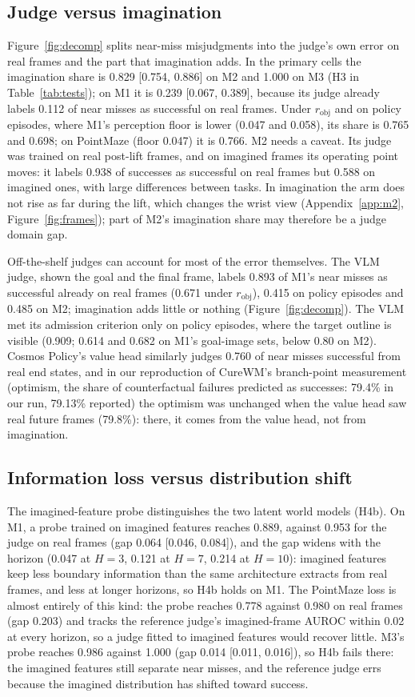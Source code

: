 \documentclass[10pt]{article}
\newcommand{\rob}{r_{\mathrm{obj}}}
\begin{document}
\subsection{Judge versus imagination}
\label{sec:judge}
Figure~\ref{fig:decomp} splits near-miss misjudgments into the judge's own error on real frames and the part that imagination adds. In the primary cells the imagination share is 0.829 [0.754, 0.886] on M2 and 1.000 on M3 (H3 in Table~\ref{tab:tests}); on M1 it is 0.239 [0.067, 0.389], because its judge already labels 0.112 of near misses as successful on real frames. Under $\rob$ and on policy episodes, where M1's perception floor is lower (0.047 and 0.058), its share is 0.765 and 0.698; on PointMaze (floor 0.047) it is 0.766. M2 needs a caveat. Its judge was trained on real post-lift frames, and on imagined frames its operating point moves: it labels 0.938 of successes as successful on real frames but 0.588 on imagined ones, with large differences between tasks. In imagination the arm does not rise as far during the lift, which changes the wrist view (Appendix~\ref{app:m2}, Figure~\ref{fig:frames}); part of M2's imagination share may therefore be a judge domain gap.

Off-the-shelf judges can account for most of the error themselves. The VLM judge, shown the goal and the final frame, labels 0.893 of M1's near misses as successful already on real frames (0.671 under $\rob$), 0.415 on policy episodes and 0.485 on M2; imagination adds little or nothing (Figure~\ref{fig:decomp}). The VLM met its admission criterion only on policy episodes, where the target outline is visible (0.909; 0.614 and 0.682 on M1's goal-image sets, below 0.80 on M2). Cosmos Policy's value head similarly judges 0.760 of near misses successful from real end states, and in our reproduction of CureWM's branch-point measurement (optimism, the share of counterfactual failures predicted as successes: 79.4\% in our run, 79.13\% reported) the optimism was unchanged when the value head saw real future frames (79.8\%): there, it comes from the value head, not from imagination.

\subsection{Information loss versus distribution shift}
\label{sec:infoloss}
The imagined-feature probe distinguishes the two latent world models (H4b). On M1, a probe trained on imagined features reaches 0.889, against 0.953 for the judge on real frames (gap 0.064 [0.046, 0.084]), and the gap widens with the horizon (0.047 at $H=3$, 0.121 at $H=7$, 0.214 at $H=10$): imagined features keep less boundary information than the same architecture extracts from real frames, and less at longer horizons, so H4b holds on M1. The PointMaze loss is almost entirely of this kind: the probe reaches 0.778 against 0.980 on real frames (gap 0.203) and tracks the reference judge's imagined-frame AUROC within 0.02 at every horizon, so a judge fitted to imagined features would recover little. M3's probe reaches 0.986 against 1.000 (gap 0.014 [0.011, 0.016]), so H4b fails there: the imagined features still separate near misses, and the reference judge errs because the imagined distribution has shifted toward success.
\end{document}
